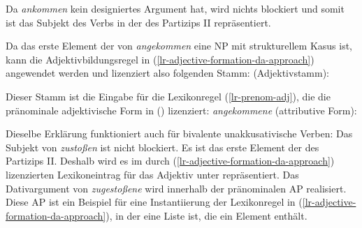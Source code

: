 {\noindent
Da \emph{ankommen} kein designiertes Argument hat, wird nichts blockiert und somit ist das Subjekt des
Verbs in der \subcatl des Partizips II repräsentiert.

Da das erste Element der \subcatl von \emph{angekommen} eine NP mit strukturellem Kasus ist,
kann die Adjektivbildungsregel in (\ref{lr-adjective-formation-da-approach}) angewendet werden
und lizenziert also folgenden Stamm:
\eas
{} (Adjektivstamm):\\
\zs

\noindent
Dieser Stamm ist die Eingabe für die Lexikonregel (\ref{lr-prenom-adj}),
die die pränominale adjektivische Form in () lizenziert:
\eas
{\em angekommene} (attributive Form):\\
\zs

\noindent
Dieselbe Erklärung funktioniert auch für bivalente unakkusativische Verben:
\z
Das Subjekt von \emph{zustoßen} ist nicht blockiert.
Es ist das erste Element der \subcatl des Partizips II.
Deshalb wird es im durch (\ref{lr-adjective-formation-da-approach}) lizenzierten
Lexikoneintrag für das Adjektiv unter \subj repräsentiert.
Das Dativargument von \emph{zugestoßene} wird innerhalb der pränominalen AP realisiert.
Diese AP ist ein Beispiel für eine Instantiierung der Lexikonregel in (\ref{lr-adjective-formation-da-approach}),
in der  eine Liste ist, die ein Element enthält.

}

